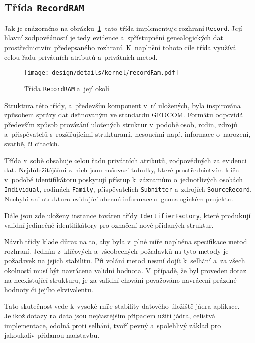 		\subsection*{Třída \texttt{RecordRAM}}
		Jak je znázorněno na obrázku~\ref{fig:designDetailRecordRAM}, tato třída implementuje rozhraní \texttt{Record}. Její hlavní zodpovědností je tedy evidence a~zpřístupnění genealogických dat prostřednictvím předepsaného rozhraní. K~naplnění tohoto cíle třída využívá celou řadu privátních atributů a~privátních metod.\par
		\begin{figure}[H]
			\centering
			\texttt{[image: design/details/kernel/recordRam.pdf]}
			\caption{Třída \texttt{RecordRAM} a~její okolí}
			\label{fig:designDetailRecordRAM}
		\end{figure}
		Struktura této třídy, a~především komponent v~ní uložených, byla inspirována způsobem správy dat definovaným ve standardu GEDCOM. Formátu odpovídá především způsob provázání uložených struktur v~podobě osob, rodin, zdrojů a~přispěvatelů s~rozšiřujícími strukturami, nesoucími např. informace o~narození, svatbě, či citacích. \par
		Třída v~sobě obsahuje celou řadu privátních atributů, zodpovědných za evidenci dat. Nejdůležitějšími z~nich jsou hašovací tabulky, které prostřednictvím klíče v~podobě identifikátoru poskytují přístup k~záznamům o~jednotlivých osobách \texttt{Individual}, rodinách \texttt{Family}, přispěvatelích \texttt{Submitter} a~zdrojích \texttt{SourceRecord}. Nechybí ani struktura evidující obecné informace o~genealogickém projektu. \par
		Dále jsou zde uloženy instance továren třídy \texttt{IdentifierFactory}, které produkují validní jedinečné identifikátory pro označení nově přidaných struktur. \par
		Návrh třídy klade důraz na to, aby byla v~plné míře naplněna specifikace metod rozhraní. Jedním z~klíčových a~všeobecných požadavků na tyto metody je požadavek na jejich stabilitu. Při volání metod nesmí dojít k~selhání a~za všech okolností musí být navrácena validní hodnota. V~případě, že byl proveden dotaz na neexistující strukturu, je za validní chování považováno navrácení prázdné hodnoty či jejího ekvivalentu. \par
		Tato skutečnost vede k~vysoké míře stability datového úložiště jádra aplikace. Jelikož dotazy na data jsou nejčastějším případem užití jádra, celistvá implementace, odolná proti selhání, tvoří pevný a~spolehlivý základ pro jakoukoliv přidanou nadstavbu.\par
		
